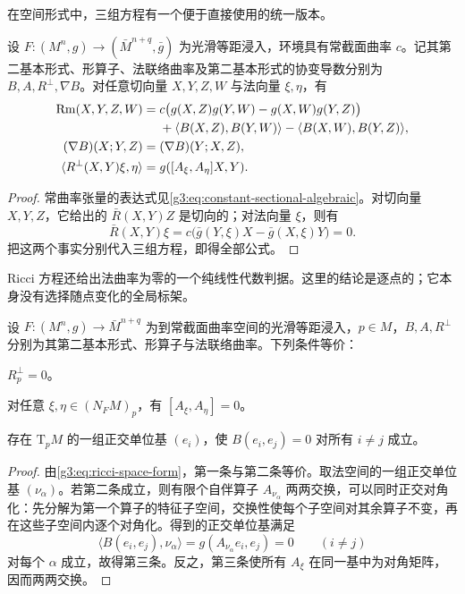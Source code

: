 在空间形式中，三组方程有一个便于直接使用的统一版本。

\begin{corollary}\label{g3:cor:space-form-compatibility}
	设 \(F\colon(M^n,g)\to(\bar M^{n+q},\bar g)\) 为光滑等距浸入，环境具有常截面曲率 \(c\)。记其第二基本形式、形算子、法联络曲率及第二基本形式的协变导数分别为 \(B,A,R^\perp,\nabla B\)。对任意切向量 \(X,Y,Z,W\) 与法向量 \(\xi,\eta\)，有
	\begin{align}
		\mathrm{Rm}(X,Y,Z,W)
		={}&c\bigl(g(X,Z)g(Y,W)-g(X,W)g(Y,Z)\bigr)\notag\\
		&+\langle B(X,Z),B(Y,W)\rangle
		-\langle B(X,W),B(Y,Z)\rangle,
		\label{g3:eq:gauss-space-form}\\
		(\nabla B)(X;Y,Z)
		={}&(\nabla B)(Y;X,Z),
		\label{g3:eq:codazzi-space-form}\\
		\langle R^\perp(X,Y)\xi,\eta\rangle
		={}&g([A_\xi,A_\eta]X,Y).
		\label{g3:eq:ricci-space-form}
	\end{align}
\end{corollary}
\begin{proof}
	常曲率张量的表达式见\eqref{g3:eq:constant-sectional-algebraic}。对切向量 \(X,Y,Z\)，它给出的 \(\bar R(X,Y)Z\) 是切向的；对法向量 \(\xi\)，则有
	\[
		\bar R(X,Y)\xi
		=c\bigl(\bar g(Y,\xi)X-\bar g(X,\xi)Y\bigr)=0.
	\]
	把这两个事实分别代入三组方程，即得全部公式。
\end{proof}

Ricci 方程还给出法曲率为零的一个纯线性代数判据。这里的结论是逐点的；它本身没有选择随点变化的全局标架。

\begin{proposition}\label{g3:prop:flat-normal-shape-commutation}
	设 \(F\colon(M^n,g)\to\bar M^{n+q}\) 为到常截面曲率空间的光滑等距浸入，\(p\in M\)，\(B,A,R^\perp\) 分别为其第二基本形式、形算子与法联络曲率。下列条件等价：
	\begin{equivalences}
		\item \(R^\perp_p=0\)。
		\item 对任意 \(\xi,\eta\in(N_FM)_p\)，有 \([A_\xi,A_\eta]=0\)。
		\item 存在 \(\mathrm{T}_pM\) 的一组正交单位基 \((e_i)\)，使 \(B(e_i,e_j)=0\) 对所有 \(i\ne j\) 成立。
	\end{equivalences}
\end{proposition}
\begin{proof}
	由\eqref{g3:eq:ricci-space-form}，第一条与第二条等价。取法空间的一组正交单位基 \((\nu_\alpha)\)。若第二条成立，则有限个自伴算子 \(A_{\nu_\alpha}\) 两两交换，可以同时正交对角化：先分解为第一个算子的特征子空间，交换性使每个子空间对其余算子不变，再在这些子空间内逐个对角化。得到的正交单位基满足
	\[
		\langle B(e_i,e_j),\nu_\alpha\rangle
		=g(A_{\nu_\alpha}e_i,e_j)=0\qquad(i\ne j)
	\]
	对每个 \(\alpha\) 成立，故得第三条。反之，第三条使所有 \(A_\xi\) 在同一基中为对角矩阵，因而两两交换。
\end{proof}


